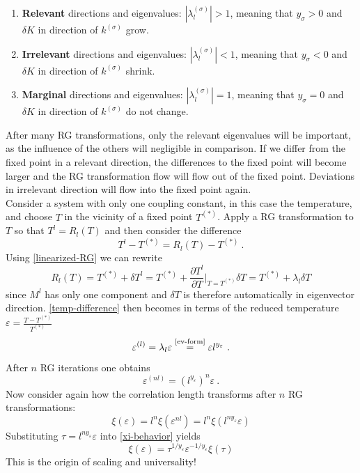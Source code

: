 	\begin{enumerate}
		\item \textbf{Relevant} directions and eigenvalues:	$|\lambda_l^{(\sigma)}| > 1$, meaning that $y_\sigma > 0$ and $\delta K$ in direction of $k^{(\sigma)}$ grow.
		\item \textbf{Irrelevant} directions and eigenvalues:	$|\lambda_l^{(\sigma)}| < 1$, meaning that $y_\sigma < 0$ and $\delta K$ in direction of $k^{(\sigma)}$ shrink.
		\item \textbf{Marginal} directions and eigenvalues:	$|\lambda_l^{(\sigma)}| = 1$, meaning that $y_\sigma = 0$ and $\delta K$ in direction of $k^{(\sigma)}$ do not change.
	\end{enumerate}
	After many RG transformations, only the relevant eigenvalues will be important, as the influence of the others will negligible in comparison. If we differ from the fixed point in a relevant direction, the differences to the fixed point will become larger and the RG transformation flow will flow out of the fixed point. Deviations in irrelevant direction will flow into the fixed point again. \\
	
	Consider a system with only one coupling constant, in this case the temperature, and choose $T$ in the vicinity of a fixed point $T^{(*)}$. Apply a RG transformation to $T$ so that $T^l =	R_l(T)$ and then consider the difference 
	\begin{equation} \label{temp-difference}
		T^l - T^{(*)} =	R_l(T) - T^{(*)}~. 
	\end{equation}
	Using \autoref{linearized-RG} we can rewrite
	\begin{equation}
		R_l(T) =	T^{(*)} + \delta T^l =	T^{(*)} + \frac{\partial T^l}{\partial T} \bigg |_{T =	T^{(*)}} \delta T =	T^{(*)} + \lambda_l \delta T
	\end{equation}
	since $M^l$ has only one component and $\delta T$ is therefore automatically in eigenvector direction. \autoref{temp-difference} then becomes in terms of the reduced temperature $ \varepsilon =	\frac{T - T^{(*)}}{T^{(*)}}$
	\begin{equation} \label{coupling-constant-ev-scaling}
		\varepsilon^{(l)} =	\lambda_l \varepsilon \overset{\text{\autoref{ev-form}}}{=} \varepsilon l^{y_\varepsilon}~.
	\end{equation}
	After $n$ RG iterations one obtains
	\begin{equation}
		\varepsilon^{(nl)} = \left( l^{y_\varepsilon}	\right)^n \varepsilon~.
	\end{equation}
	Now consider again how the correlation length transforms after $n$ RG transformations:
	\begin{equation} \label{xi-behavior}
		\xi(\varepsilon) =	l^n \xi(\varepsilon^{nl}) =	l^n \xi( l^{ny_\varepsilon} \varepsilon)
	\end{equation}
	Substituting $\tau =	l^{ny_\varepsilon} \varepsilon$ into \autoref{xi-behavior} yields
	\begin{equation} \label{RG-xi-scaling}
		\xi(\varepsilon) =	\tau^{1 / y_\varepsilon} \varepsilon^{-1/ y_\varepsilon} \xi(\tau)
	\end{equation}
	This is the origin of scaling and universality!
